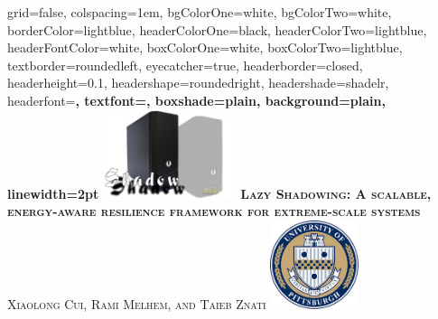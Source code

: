 \documentclass[landscape,final,a0paper,fontscale=0.285]{baposter}
\begin{document}
\begin{poster}%
  {
  grid=false,
  colspacing=1em,
  bgColorOne=white,
  bgColorTwo=white,
  borderColor=lightblue,
  headerColorOne=black,
  headerColorTwo=lightblue,
  headerFontColor=white,
  boxColorOne=white,
  boxColorTwo=lightblue,
  textborder=roundedleft,
  eyecatcher=true,
  headerborder=closed,
  headerheight=0.1\textheight,
  headershape=roundedright,
  headershade=shadelr,
  headerfont=\Large\bf\textsc, %
  textfont={\setlength{\parindent}{1.5em}},
  boxshade=plain,
  background=plain,
  linewidth=2pt
  }
  {\includegraphics[height=7em]{images/shadow.jpg}} 
  {\bf\textsc{Lazy Shadowing: A scalable, energy-aware resilience
  framework for extreme-scale systems}\vspace{0.5em}}
  {\textsc{Xiaolong Cui, Rami Melhem, and Taieb Znati}}
  {%
    \includegraphics[height=7.0em]{images/logo.jpg}
  }

    \newcommand{\colouredcircle}{%
      \tikz{\useasboundingbox (-0.2em,-0.32em) rectangle(0.2em,0.32em); \draw[draw=black,fill=lightblue,line width=0.03em] (0,0) circle(0.18em);}}


\end{poster}
\end{document}
